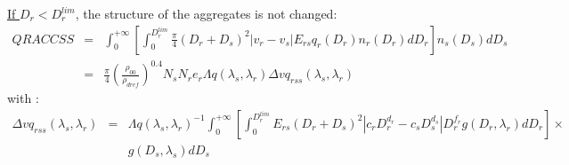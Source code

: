 \noindent
\underline{If $D_r < D_{r} ^{lim}$}, the structure of the aggregates is not changed:
\begin{eqnarray}
  QRACCSS &=& \int_0 ^{+ \infty} \left[ \int_0 ^{D_r ^{lim}}
            \frac{\pi}{4} (D_r + D_s)^2 |v_r - v_s| E_{rs} q_r (D_r) 
            n_r (D_r) dD_r
            \right] n_s (D_s) dD_s \nonumber \\
          &=& \frac{\pi}{4} 
              \left( \frac{\rho _{00}}{\rho _{dref}} \right)^{0.4}
              N_s N_r e_r \Lambda q(\lambda _s, \lambda _r)
              \Delta vq_{rss}(\lambda _s, \lambda _r)
\end{eqnarray}
with :
\begin{eqnarray}
  \Delta vq_{rss}(\lambda _s, \lambda _r) & = &
    \Lambda q(\lambda _s, \lambda _r)^{-1} \int_0 ^{+ \infty} \left[
      \int_0 ^{D_r ^{lim}} E_{rs} (D_r + D_s)^2 
      |c_r D_r ^{d_r} - c_s D_s ^{d_s}| D_r ^{f_r} g(D_r , \lambda _r)dD_r 
    \right] \times \nonumber \\
      &  & g(D_s , \lambda _s) dD_s
\end{eqnarray}

